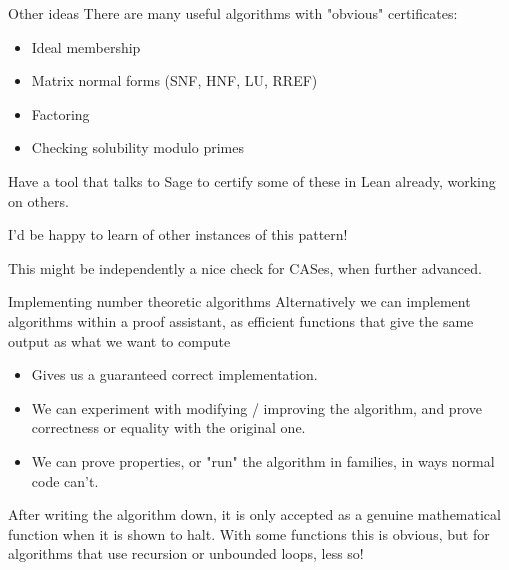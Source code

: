 \documentclass{beamer}
\theoremstyle{plain}
\begin{document}
\begin{frame}{Other ideas}
    There are many useful algorithms with "obvious" certificates:
    \begin{itemize}
        \item Ideal membership
        \item Matrix normal forms (SNF, HNF, LU, RREF)
        \item Factoring
        \item Checking solubility modulo primes
    \end{itemize}
\pause
    Have a tool that talks to Sage to certify some of these in Lean already, working on others.

    I'd be happy to learn of other instances of this pattern!

    This might be independently a nice check for CASes, when further advanced.
\end{frame}


\begin{frame}{Implementing number theoretic algorithms}
    Alternatively we can implement algorithms within a proof assistant, as efficient functions that give the same output as what we want to compute
    \begin{itemize}
        \item Gives us a guaranteed correct implementation.
        \item We can experiment with modifying / improving the algorithm, and prove correctness or equality with the original one.
        \item We can prove properties, or "run" the algorithm in families, in ways normal code can't.
    \end{itemize}

    After writing the algorithm down, it is only accepted as a genuine mathematical function when it is shown to halt.
    With some functions this is obvious, but for algorithms that use recursion or unbounded loops, less so!
\end{frame}
\end{document}
